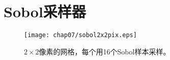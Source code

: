 \section{Sobol采样器}\label{sec:Sobol采样器}
\begin{figure}[htbp]
    \centering\texttt{[image: chap07/sobol2x2pix.eps]}
    \caption{$2\times2$像素的网格，每个用16个Sobol样本采样。}
    \label{fig:7.36}
\end{figure}